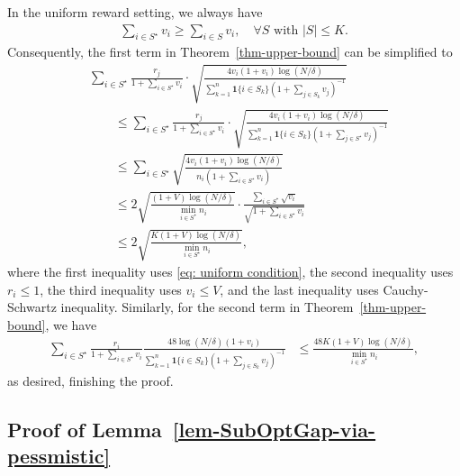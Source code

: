 \documentclass[10pt, letterpaper]{article}
\begin{document}
In the uniform reward setting, we always have \begin{align}
    \sum_{i\in S^\star} v_i \geq \sum_{i\in S} v_i,\quad \forall S \text{ with }\lvert S \rvert \leq K.\label{eq: uniform condition}
\end{align}
Consequently, the first term in Theorem~\ref{thm-upper-bound} can be simplified to
\allowdisplaybreaks
\begin{align*}
  &\sum_{i\in S^\star} \frac{r_j}{1+\sum_{i\in S^\star} v_i}\cdot \sqrt{\frac{4v_i(1+v_i)\log (N/\delta) }{\sum_{k = 1}^n \bm{1}\{i\in S_k\}(1+\sum_{j\in S_k}v_j)^{-1}}}\\
  &\qquad \leq   \sum_{i\in S^\star} \frac{r_j}{1+\sum_{i\in S^\star} v_i} \cdot\sqrt{\frac{4v_i(1+v_i)\log (N/\delta) }{\sum_{k = 1}^n \bm{1}\{i\in S_k\}(1+\sum_{j\in S^\star}v_j)^{-1}}} \\
  &\qquad \leq \sum_{i\in S^\star} \sqrt{\frac{4v_i(1+v_i)\log (N/\delta) }{n_i (1+\sum_{i\in S^\star} v_i)}} \\
  &\qquad \leq 
2\sqrt{\frac{(1+V)\log(N/\delta)}{\min_{i\in S^\star} n_i}}  \cdot \frac{\sum_{i\in S^\star}\sqrt{v_i}}{\sqrt{1+\sum_{i\in S^\star} v_i} } \\
&\qquad \leq 2\sqrt{\frac{K(1+V)\log(N/\delta)}{\min_{i\in S^\star} n_i}},
\end{align*}
where the first inequality uses \eqref{eq: uniform condition}, the second inequality uses $r_i\leq 1$, the third inequality uses  $v_i\leq V$, and the last inequality uses Cauchy-Schwartz inequality.
Similarly, for the second term in Theorem~\ref{thm-upper-bound}, we have 
\begin{align*}
    \sum_{i\in S^\star} \frac{r_i}{1+\sum_{i\in S^\star} v_i}\frac{48\log(N/\delta) (1+v_i)}{\sum_{k = 1}^n \bm{1}\{i\in S_k\}(1+\sum_{j\in S_k}v_j)^{-1}} &\leq \frac{48K(1+V)\log(N/\delta)}{\min_{i\in S^\star} n_i},
\end{align*}
as desired, finishing the proof.
\endproof


\subsection{Proof of Lemma~\ref{lem-SubOptGap-via-pessmistic}}\label{subsec: proof pessimistic}
\end{document}
